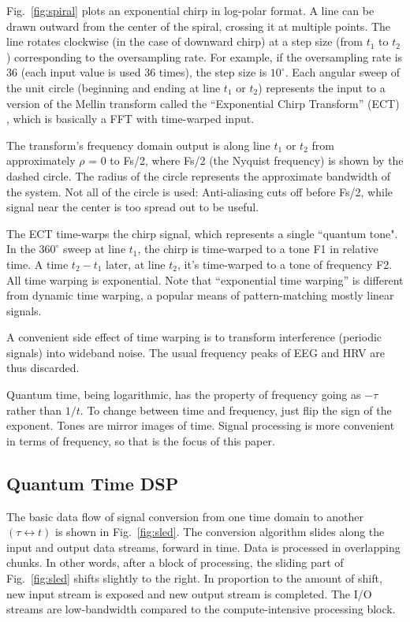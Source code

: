 Fig.~\ref{fig:spiral} plots an exponential chirp in log-polar format.
A line can be drawn outward from the center of the spiral, crossing it at
multiple points.
The line rotates clockwise (in the case of downward chirp) at a step size
(from $t_1$ to $t_2$) corresponding to the oversampling rate.
For example, if the oversampling rate is 36 (each input value is used 36 times),
the step size is $10^{\circ}$.
Each angular sweep of the unit circle
(beginning and ending at line $t_1$ or $t_2$)
represents the input to a version of the Mellin transform called the
``Exponential Chirp Transform'' (ECT) \cite{Bonmassar}, which is
basically a FFT with time-warped input.

The transform's frequency domain output is along line $t_1$ or $t_2$ from
approximately $\rho$ = 0 to Fs/2, where Fs/2 (the Nyquist frequency)
is shown by the dashed circle.
The radius of the circle represents the approximate bandwidth of the system.
Not all of the circle is used: Anti-aliasing cuts off before Fs/2, while signal
near the center is too spread out to be useful.

The ECT time-warps the chirp signal, which represents a single ``quantum tone".
In the $360^{\circ}$ sweep at line $t_1$,
the chirp is time-warped to a tone F1 in relative time.
A time $t_2-t_1$ later, at line $t_2$,
it's time-warped to a tone of frequency F2.
All time warping is exponential.
Note that ``exponential time warping'' is different from dynamic time warping,
a popular means of pattern-matching mostly linear signals.

A convenient side effect of time warping is to transform interference
(periodic signals) into wideband noise.
The usual frequency peaks of EEG and HRV are thus discarded.

Quantum time, being logarithmic, has the property of frequency going as
$-\tau$ rather than $1/t$.
To change between time and frequency, just flip the sign of the exponent.
Tones are mirror images of time.
Signal processing is more convenient in terms of frequency,
so that is the focus of this paper.

\subsection{\label{sec:level1}Quantum Time DSP}

The basic data flow of signal conversion from one time domain to another
$(\tau \leftrightarrow t)$ is shown in Fig.~\ref{fig:sled}.
The conversion algorithm slides along the input and output data streams,
forward in time.
Data is processed in overlapping chunks.
In other words, after a block of processing,
the sliding part of Fig.~\ref{fig:sled} shifts slightly to the right.
In proportion to the amount of shift,
new input stream is exposed and new output stream is completed.
The I/O streams are low-bandwidth compared to the compute-intensive
processing block.

